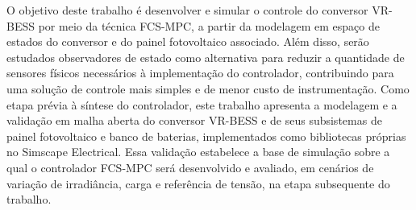 O objetivo deste trabalho é desenvolver e simular o controle do conversor
VR-BESS por meio da técnica FCS-MPC, a partir da modelagem em espaço de
estados do conversor e do painel fotovoltaico associado. Além disso, serão
estudados observadores de estado como alternativa para reduzir a
quantidade de sensores físicos necessários à implementação do
controlador, contribuindo para uma solução de controle mais simples e de
menor custo de instrumentação. Como etapa prévia à síntese do controlador,
este trabalho apresenta a modelagem e a validação em malha aberta do
conversor VR-BESS e de seus subsistemas de painel fotovoltaico e banco de
baterias, implementados como bibliotecas próprias no Simscape Electrical.
Essa validação estabelece a base de simulação sobre a qual o controlador
FCS-MPC será desenvolvido e avaliado, em cenários de variação de
irradiância, carga e referência de tensão, na etapa subsequente do
trabalho.
